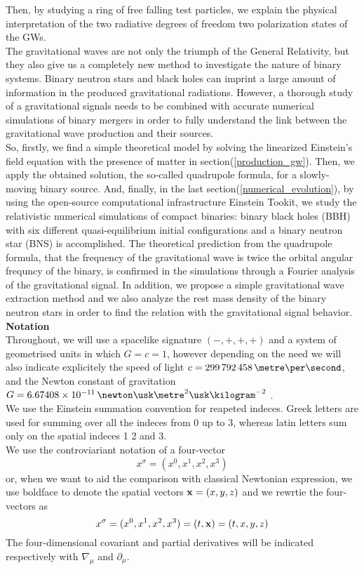 Then, by studying a ring of free falling test particles, we explain the physical interpretation of the two radiative degrees of freedom two polarization states of the GWs.\\
The gravitational waves are not only the triumph of the General Relativity, but they also give us a completely new method to investigate the nature of binary systems. 
Binary neutron stars and black holes can imprint a large amount of information in the produced gravitational radiations.
However, a thorough study of a gravitational signals needs to be combined with accurate numerical simulations of binary mergers in order to fully understand the link between the  gravitational wave production and their sources.\\
So, firstly, we find a simple theoretical model by solving the linearized Einstein's field equation with the presence of matter in section(\ref{production_gw}).
Then, we apply the obtained solution, the so-called quadrupole formula, for a slowly-moving binary source.
And, finally, in the last section(\ref{numerical_evolution}), by using the open-source computational infrastructure Einstein Tookit\cite{loffler_einstein_2012}, we study the relativistic numerical simulations of compact binaries: binary black holes (BBH) with six different quasi-equilibrium initial configurations and a binary neutron star (BNS) is accomplished.
The theoretical prediction from the quadrupole formula, that the frequency of the gravitational wave is twice the orbital angular frequncy of the binary, is confirmed in the simulations through a Fourier analysis of the gravitational signal.
In addition, we propose a simple gravitational wave extraction method and we also analyze the rest mass density of the binary neutron stars in order to find the relation with the gravitational signal behavior.\\

\textbf{Notation}\\
Throughout, we will use a spacelike signature $(-,+,+,+)$ and a system of geometrised units in which $G=c=1$, however depending on the need we will also indicate explicitely the speed of light $c=299\,792\,458 \,\metre \per \second$, and the Newton constant of gravitation $G=6.67408 \times 10^{-11} \, \newton \usk \metre^2 \usk \kilogram^{-2}$ \cite{codata_blog_codata_nodate}.\\
We use the Einstein summation convention for  reapeted indeces.
Greek letters are used for summing over all the indeces from 0 up to 3,
whereas latin letters sum only on the spatial indeces 1 2 and 3.\\
We use the controviariant notation of a four-vector
\[
x^{\sigma} = (x^{0},x^{1}, x^{2},x^{3})
\]
or, when we want to aid the comparison with classical Newtonian expression, we use boldface to denote the spatial vectors $\vb{x} =(x,y,z)$ and we rewrtie the four-vectors as 
\[
x^{\sigma} = (x^{0},x^{1}, x^{2},x^{3}) = (t,\vb{x}) = (t,x,y,z)
\]
The four-dimensional covariant and partial derivatives will be indicated respectively with $\nabla _{\mu}$ and $\partial _\mu$.\\

